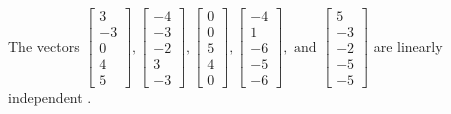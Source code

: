 \begin{exercise}
\begin{exerciseStatement}
  \end{exerciseStatement}
  \begin{exerciseAnswer}
   The vectors \(\left[\begin{array}{r}
3 \\
-3 \\
0 \\
4 \\
5
\end{array}\right] , \left[\begin{array}{r}
-4 \\
-3 \\
-2 \\
3 \\
-3
\end{array}\right] , \left[\begin{array}{r}
0 \\
0 \\
5 \\
4 \\
0
\end{array}\right] , \left[\begin{array}{r}
-4 \\
1 \\
-6 \\
-5 \\
-6
\end{array}\right] , \text{ and } \left[\begin{array}{r}
5 \\
-3 \\
-2 \\
-5 \\
-5
\end{array}\right]\) are 
  	 linearly independent  .
  


  \end{exerciseAnswer}
\end{exercise}
